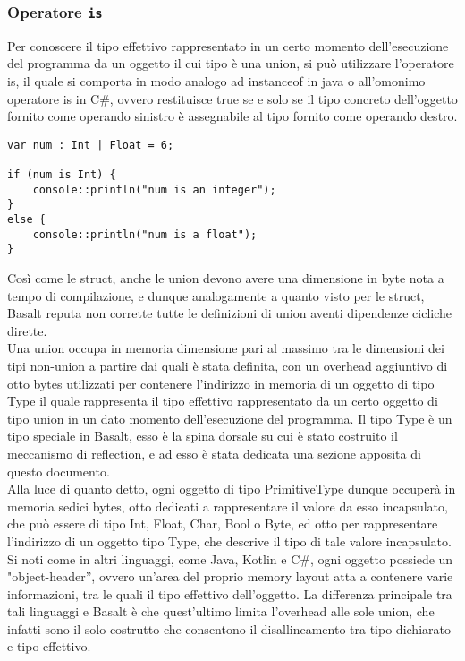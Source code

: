 \subsubsection{Operatore \texttt{is}} 
Per conoscere il tipo effettivo rappresentato in un certo momento dell’esecuzione del programma da un oggetto il cui tipo è una union, si può utilizzare 
l’operatore is, il quale si comporta in modo analogo ad instanceof in java o all’omonimo operatore is in C\#, ovvero restituisce true se e solo se il tipo 
concreto dell’oggetto fornito come operando sinistro è assegnabile al tipo fornito come operando destro. \\

\vspace{0.5cm}
\begin{lstlisting}[frame=single]
var num : Int | Float = 6;

if (num is Int) {
    console::println("num is an integer");
}
else { 
    console::println("num is a float");
}
\end{lstlisting}
\vspace{0.5cm}


Così come le struct, anche le union devono avere una dimensione in byte nota a tempo di compilazione, e dunque analogamente a 
quanto visto per le struct, Basalt reputa non corrette tutte le definizioni di union aventi dipendenze cicliche dirette. \\ 

Una union occupa in memoria dimensione pari al massimo tra le dimensioni dei tipi non-union a partire dai quali è stata definita, 
con un overhead aggiuntivo di otto bytes utilizzati per contenere l’indirizzo in memoria di un oggetto di tipo Type il quale rappresenta 
il tipo effettivo rappresentato da un certo oggetto di tipo union in un dato momento dell’esecuzione del programma. Il tipo Type è un 
tipo speciale in Basalt, esso è la spina dorsale su cui è stato costruito il meccanismo di reflection, 
e ad esso è stata dedicata una sezione apposita di questo documento. \\

Alla luce di quanto detto, ogni oggetto di tipo PrimitiveType dunque occuperà in memoria sedici bytes, otto dedicati a rappresentare 
il valore da esso incapsulato, che può essere di tipo Int, Float, Char, Bool o Byte, ed otto per rappresentare 
l’indirizzo di un oggetto tipo Type, che descrive il tipo di tale valore incapsulato. \\

Si noti come in altri linguaggi, come Java, Kotlin e C\#, ogni oggetto possiede un "object-header”, ovvero un’area del proprio memory 
layout atta a contenere varie informazioni, tra le quali il tipo effettivo dell’oggetto. La differenza principale tra 
tali linguaggi e Basalt è che quest’ultimo limita l’overhead alle sole union, che infatti sono il solo costrutto che consentono 
il disallineamento tra tipo dichiarato e tipo effettivo.